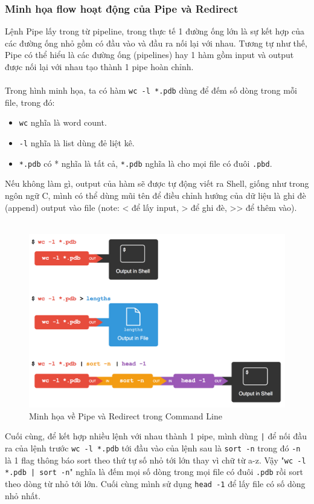 \documentclass[11pt]{article}
\begin{document}
\vspace{6.4in} %

\subsubsection{Minh họa flow hoạt động của Pipe và Redirect}
Lệnh Pipe lấy trong từ pipeline, trong thực tế 1 đường ống lớn là sự kết hợp của các đường ống nhỏ gồm có đầu vào và đầu ra nối lại với nhau. Tương tự như thế, Pipe có thể hiểu là các đường ống (pipelines) hay 1 hàm gồm input và output được nối lại với nhau tạo thành 1 pipe hoàn chỉnh. \\ \\

Trong hình minh họa, ta có hàm \texttt{wc -l *.pdb} dùng để đếm số dòng trong mỗi file, trong đó:
\begin{itemize}
	\item \texttt{wc} nghĩa là word count.
	\item \texttt{-l} nghĩa là list dùng đẻ liệt kê.
	\item \texttt{*.pdb} có * nghĩa là tất cả, \texttt{*.pdb} nghĩa là cho mọi file có đuôi \texttt{.pbd}.
\end{itemize}
Nếu không làm gì, output của hàm sẽ được tự động viết ra Shell, giống như trong ngôn ngữ C, mình có thể dùng mũi tên để điều chỉnh hướng của dữ liệu là ghi đè (append) output vào file (note: < để lấy input, > để ghi đè, >> để thêm vào). \\ \\

\begin{figure}[H]
	\centering
	\includegraphics[width=0.7 \textwidth]{UnixPipe_flow.png}
	\caption{Minh họa về Pipe và Redirect trong Command Line}
	\label{fig:pipe_workflow}
\end{figure}

Cuối cùng, để kết hợp nhiều lệnh với nhau thành 1 pipe, mình dùng \texttt{|} để nối đầu ra của lệnh trước \texttt{wc -l *.pdb} tới đầu vào của lệnh sau là \texttt{sort -n} trong đó \texttt{-n} là 1 flag thông báo sort theo thứ tự số nhỏ tới lớn thay vì chữ từ a-z.
Vậy "\texttt{wc -l *.pdb | sort -n}" nghĩa là đếm mọi số dòng trong mọi file có đuôi \texttt{.pdb} rồi sort theo dòng từ nhỏ tới lớn. Cuối cùng mình sử dụng \texttt{head -1} để lấy file có số dòng nhỏ nhất.
\end{document}
